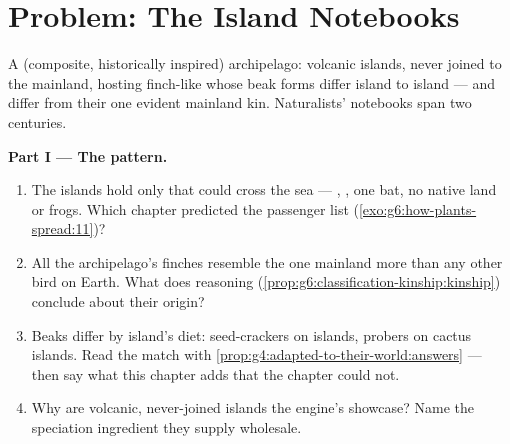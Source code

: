 \section{Problem: The Island Notebooks}

\begin{problem}\label{pb:g9:how-species-change:1}
A (composite, historically inspired) archipelago:
volcanic islands, never joined to the mainland, hosting
finch-like  whose beak forms differ island to
island --- and differ from their one evident mainland
kin. Naturalists' notebooks span two centuries.

\medskip\noindent\textbf{Part I --- The pattern.}
\begin{enumerate}
  \item The islands hold only  that could cross
        the sea --- , , one bat, no
        native land  or frogs. Which chapter
        predicted the passenger list
        (\cref{exo:g6:how-plants-spread:11})?
  \item All the archipelago's finches resemble the one
        mainland  more than any other bird on
        Earth. What does  reasoning
        (\cref{prop:g6:classification-kinship:kinship})
        conclude about their origin?
  \item Beaks differ by island's diet: seed-crackers on
         islands, probers on cactus islands. Read
        the match with
        \cref{prop:g4:adapted-to-their-world:answers} ---
        then say what this chapter adds that the
         chapter could not.
  \item Why are volcanic, never-joined islands the
        engine's showcase? Name the speciation
        ingredient they supply wholesale.
\end{enumerate}


\end{problem}
